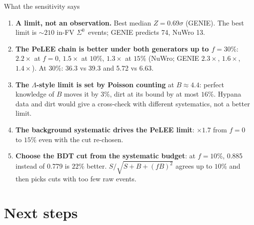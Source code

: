 \documentclass[aspectratio=169,10pt]{beamer}
\newcommand{\Szero}{\ensuremath{\Sigma^{0}}}
\newcommand{\Lam}{\ensuremath{\Lambda}}
\begin{document}
\begin{frame}{What the sensitivity says}
  \begin{enumerate}
    \item \textbf{A limit, not an observation.} Best median $Z = 0.69\sigma$ (GENIE).
          The best limit is $\sim210$ in-FV \Szero\ events; GENIE predicts 74, NuWro 13.
    \item \textbf{The PeLEE chain is better under both generators up to $f=30\%$}:
          $2.2\times$ at $f=0$, $1.5\times$ at $10\%$, $1.3\times$ at $15\%$ (NuWro; GENIE
          $2.3\times$, $1.6\times$, $1.4\times$). At $30\%$: 36.3 vs 39.3 and 5.72 vs 6.63.
    \item \textbf{The \Lam-style limit is set by Poisson counting} at $B\approx4.4$:
          perfect knowledge of $B$ moves it by $3\%$, dirt at its bound by at most $16\%$.
          Hypana data and dirt would give a cross-check with different systematics, not a
          better limit.
    \item \textbf{The background systematic drives the PeLEE limit}: $\times1.7$ from
          $f=0$ to $15\%$ even with the cut re-chosen.
    \item \textbf{Choose the BDT cut from the systematic budget}: at $f=10\%$, 0.885
          instead of 0.779 is $22\%$ better. $S/\sqrt{S+B+(fB)^2}$ agrees up to $10\%$ and
          then picks cuts with too few raw events.
  \end{enumerate}
\end{frame}

\section{Next steps}
\end{document}
